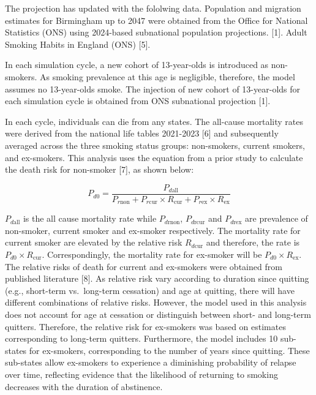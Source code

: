 \documentclass[
  letterpaper,
  DIV=11,
  numbers=noendperiod]{scrartcl}
\begin{document}
{The projection has updated with the fololwing data. Population and
migration estimates for Birmingham up to 2047 were obtained from the
Office for National Statistics (ONS) using 2024-based subnational
population projections. {[}1{]}. Adult Smoking Habits in England (ONS)
{[}5{]}.}

In each simulation cycle, a new cohort of 13-year-olds is introduced as
non-smokers. As smoking prevalence at this age is negligible, therefore,
the model assumes no 13-year-olds smoke. The injection of new cohort of
13-year-olds for each simulation cycle is obtained from ONS subnational
projection {[}1{]}.

In each cycle, individuals can die from any states. The all-cause
mortality rates were derived from the national life tables 2021-2023
{[}6{]} and subsequently averaged across the three smoking status
groups: non-smokers, current smokers, and ex-smokers. This analysis uses
the equation from a prior study to calculate the death risk for
non-smoker {[}7{]}, as shown below:

\[ P_{d0} = \frac{P_{d\text{all}}}{P_{r\text{non}} + P_{r\text{cur}} \times R_{\text{cur}} + P_{r\text{ex}} \times R_{\text{ex}}} \]

\(P_{d\text{all}}\) is the all cause mortality rate while
\(P_{d\text{rnon}}\), \(P_{d\text{rcur}}\) and \(P_{d\text{rex}}\) are
prevalence of non-smoker, current smoker and ex-smoker respectively. The
mortality rate for current smoker are elevated by the relative risk
\(R_{d\text{cur}}\) and therefore, the rate is
\(P_{d0} \times R_{\text{cur}}\). Correspondingly, the mortality rate
for ex-smoker will be \(P_{d0} \times R_{\text{ex}}\). The relative
risks of death for current and ex-smokers were obtained from published
literature {[}8{]}. As relative risk vary according to duration since
quitting (e.g., short-term vs.~long-term cessation) and age at quitting,
there will have different combinations of relative risks. However, the
model used in this analysis does not account for age at cessation or
distinguish between short- and long-term quitters. Therefore, the
relative risk for ex-smokers was based on estimates corresponding to
long-term quitters. Furthermore, the model includes 10 sub-states for
ex-smokers, corresponding to the number of years since quitting. These
sub-states allow ex-smokers to experience a diminishing probability of
relapse over time, reflecting evidence that the likelihood of returning
to smoking decreases with the duration of abstinence.
\end{document}
